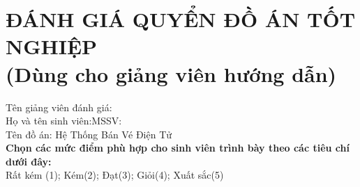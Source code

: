 \section*{ĐÁNH GIÁ QUYỂN ĐỒ ÁN TỐT NGHIỆP\\\fontsize{14pt}{0pt}\selectfont \vspace{4pt}\textnormal{(Dùng cho giảng viên hướng dẫn)}}
\thispagestyle{empty}
\vspace{-16pt}
\hspace{-1cm}Tên giảng viên đánh giá:\dotfill\\
Họ và tên sinh viên:\dotfill MSSV:\dotfill\\
Tên đồ án: Hệ Thống Bán Vé Điện Tử
\\
\textbf{Chọn các mức điểm phù hợp cho sinh viên trình bày theo các tiêu chí dưới đây:}\\
Rất kém (1); Kém(2); Đạt(3); Giỏi(4); Xuất sắc(5)
